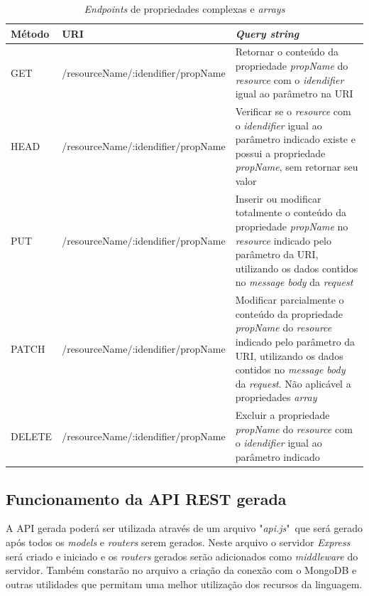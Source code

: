 \begin{table}[]
    \centering
    \begin{tabularx}{\textwidth}{|l|l|X|}
        \hline
        \textbf{Método} & \textbf{URI} & \textbf{\textit{Query string}} \\
        \hline

        GET & /resourceName/:idendifier/propName & Retornar o conteúdo da propriedade \textit{propName} do \textit{resource} com o \textit{idendifier} igual ao parâmetro na URI\\
        \hline

        HEAD & /resourceName/:idendifier/propName & Verificar se o \textit{resource} com o \textit{idendifier} igual ao parâmetro indicado existe e possui a propriedade \textit{propName}, sem retornar seu valor\\
        \hline

        PUT & /resourceName/:idendifier/propName & Inserir ou modificar totalmente o conteúdo da propriedade \textit{propName} no \textit{resource} indicado pelo parâmetro da URI, utilizando os dados contidos no \textit{message body} da \textit{request}\\
        \hline

        PATCH & /resourceName/:idendifier/propName & Modificar parcialmente o conteúdo da propriedade \textit{propName} do \textit{resource} indicado pelo parâmetro da URI, utilizando os dados contidos no \textit{message body} da \textit{request}. Não aplicável a propriedades \textit{array}\\
        \hline

        DELETE & /resourceName/:idendifier/propName & Excluir a propriedade \textit{propName} do \textit{resource} com o \textit{idendifier} igual ao parâmetro indicado\\
        \hline
        \hline
    \end{tabularx}
    \caption{\textit{Endpoints} de propriedades complexas e \textit{arrays}}
    \label{tab:end_prop}
\end{table}



\subsection{Funcionamento da API REST gerada}

A API gerada poderá ser utilizada através de um arquivo "\textit{api.js}"\ que será gerado após todos os \textit{models} e \textit{routers} serem gerados. Neste arquivo o servidor \textit{Express} será criado e iniciado e os \textit{routers} gerados serão adicionados como \textit{middleware} do servidor. Também constarão no arquivo a criação da conexão com o MongoDB e outras utilidades que permitam uma melhor utilização dos recursos da linguagem.

